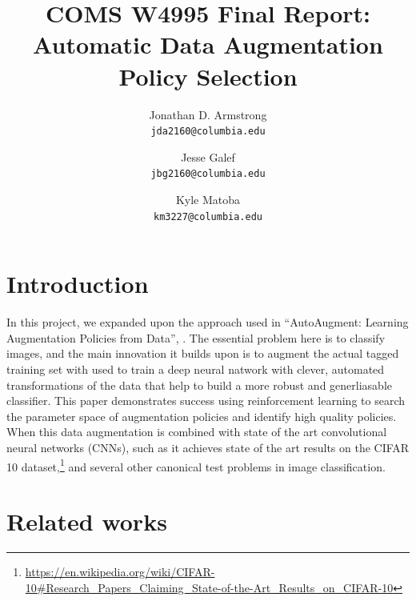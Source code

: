 \documentclass[10pt,twocolumn,letterpaper]{article}
\begin{document}
\title{COMS W4995 Final Report: Automatic Data Augmentation Policy Selection}
\author{Jonathan D. Armstrong\\
{\tt\small jda2160@columbia.edu}
\and
Jesse Galef\\
{\tt\small jbg2160@columbia.edu}
\and
Kyle Matoba\\
{\tt\small km3227@columbia.edu}
}

\maketitle



\section{Introduction}

	In this project, we expanded upon the approach used in ``AutoAugment: Learning Augmentation Policies from Data'', \cite{Cubuk2018}. The essential problem here is to classify images, and the main innovation it builds upon is to augment the actual tagged training set with used to train a deep neural natwork with clever, automated transformations of the data that help to build a more robust and generliasable classifier. This paper demonstrates success using reinforcement learning to search the parameter space of augmentation policies and identify high quality policies. When this data augmentation is combined with state of the art convolutional neural networks (CNNs), such as \cite{Yamada2018} it achieves state of the art results on the CIFAR 10 dataset,\footnote{\url{https://en.wikipedia.org/wiki/CIFAR-10\#Research\_Papers\_Claiming\_State-of-the-Art\_Results\_on\_CIFAR-10}} and several other canonical test problems in image classification.

\section{Related works}
\end{document}
